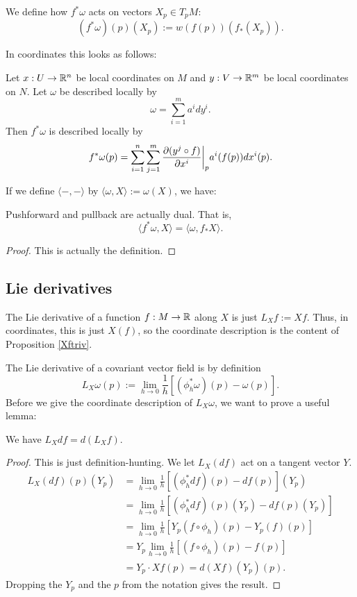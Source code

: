 \documentclass[11pt, english]{article}
\begin{document}
\begin{defi}
We define how $f^\ast \omega$ acts on vectors $X_p \in T_p M$:
\[
(f^\ast \omega)(p)(X_p) := w(f(p))(f_\ast(X_p)).
\]
\end{defi}

In coordinates this looks as follows:
\begin{prop}
Let $x:U \to \mathbb{R}^n$ be local coordinates on $M$ and $y:V \to \mathbb{R}^m$ be local coordinates on $N$. Let $\omega$ be described locally by
\[
\omega = \sum_{i=1}^m a^i dy^i.
\]
Then $f^\ast \omega$ is described locally by
\[
f^\ast \omega(p) = \sum_{i=1}^n \sum_{j=1}^m \restr{\dd{(y^j \circ f)}{x^i}}{p} a^i(f(p)) dx^i(p).
\]
\end{prop}

If we define $\langle -,- \rangle$ by $\langle \omega, X \rangle := \omega(X)$, we have:
\begin{prop}
Pushforward and pullback are actually dual. That is,
\[
\langle f^\ast \omega, X \rangle = \langle \omega, f_\ast X \rangle.
\]
\end{prop}
\begin{proof}
This is actually the definition.
\end{proof}

\subsection{Lie derivatives}

The Lie derivative of a function $f:M \to \mathbb{R}$ along $X$ is just $L_Xf := Xf$. Thus, in coordinates, this is just $X(f)$, so the coordinate description is the content of Proposition \ref{Xftriv}.

The Lie derivative of a covariant vector field is by definition
\[
L_X\omega(p) := \lim_{h \to 0} \frac 1h \left[ (\phi_h^\ast \omega)(p) - \omega(p) \right].
\]
Before we give the coordinate description of $L_X \omega$, we want to prove a useful lemma:
\begin{lemma}
\label{lxdf}
We have $L_X df = d(L_Xf)$.
\end{lemma}
\begin{proof}
This is just definition-hunting. We let $L_X(df)$ act on a tangent vector $Y$.
\begin{align*}
L_X (df)(p)(Y_p) &= \lim_{h \to 0} \frac 1h \left[ (\phi_h^\ast df)(p) - df(p) \right](Y_p) \\
&= \lim_{h \to 0} \frac 1h \left[ (\phi_h^\ast df)(p)(Y_p) - df(p)(Y_p) \right] \\
&= \lim_{h \to 0} \frac 1h \left[ Y_p(f \circ \phi_h)(p)-Y_p(f)(p) \right] \\
&= Y_p \lim_{h \to 0} \frac 1h \left[ (f \circ \phi_h)(p)-f(p) \right] \\
&= Y_p \cdot  Xf(p) = d(Xf)(Y_p)(p).
\end{align*}
Dropping the $Y_p$ and the $p$ from the notation gives the result.
\end{proof}
\end{document}
